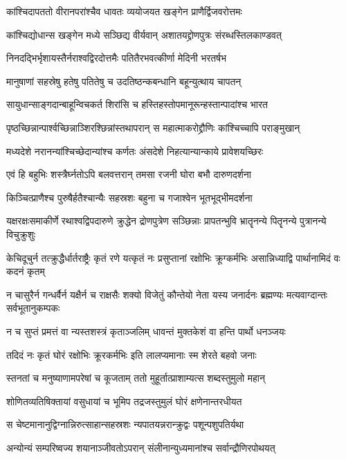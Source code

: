 \twolineshloka
{कांश्चिदापततो वीरानपरांश्चैव धावतः}
{व्ययोजयत खङ्गेन प्राणैर्द्विजवरोत्तमः}


\twolineshloka
{कांश्चिद्योधान्स खङ्गेन मध्ये सञ्छिद्य वीर्यवान्}
{अशातयद्द्रोणपुत्रः संरब्धस्तिलकाण्डवत्}


\twolineshloka
{निनदद्भिर्भृशायस्तैर्नराश्वद्विरदोत्तमैः}
{पतितैरभवत्कीर्णा मेदिनी भरतर्षभ}


\twolineshloka
{मानुषाणां सहस्रेषु हतेषु पतितेषु च}
{उदतिष्ठन्कबन्धानि बहून्युत्थाय चापतन्}


\twolineshloka
{सायुधान्साङ्गदान्बाहून्विचकर्त शिरांसि च}
{हस्तिहस्तोपमानूरून्हस्तान्पादांश्च भारत}


\twolineshloka
{पृष्ठच्छिन्नान्पार्श्वच्छिन्नाञ्शिरश्छिन्नांस्तथापरान्}
{स महात्माकरोद्द्रौणिः कांश्चिच्चापि पराङ्मुखान्}


\twolineshloka
{मध्यदेशे नरानन्यांश्चिच्छेदान्यांश्च कर्णतः}
{अंसदेशे निहत्यान्यान्काये प्रावेशयच्छिरः}


\twolineshloka
{एवं हि बहुभिः शस्त्रैर्घ्नतोऽपि बलवत्तरान्}
{तमसा रजनी घोरा बभौ दारुणदर्शना}


\twolineshloka
{किञ्चित्प्राणैश्च पुरुषैर्हतैश्चान्यैः सहस्रशः}
{बहुना च गजाश्वेन भूतभूद्भीमदर्शना}


\threelineshloka
{यक्षरक्षःसमाकीर्णे रथाश्वद्विपदारुणे}
{क्रुद्धेन द्रोणपुत्रेण सञ्छिन्नाः प्रापतन्भुवि}
{भ्रातॄनन्ये पितॄनन्ये पुत्रानन्ये विचुक्रुशुः}


\threelineshloka
{केचिदूचुर्न तत्क्रुद्धैर्धार्तराष्ट्रैः कृतं रणे}
{यत्कृतं नः प्रसुप्तानां रक्षोभिः क्रूग्कर्मभिः}
{असान्निध्याद्वि पार्थानामिदं वः कदनं कृतम्}


\threelineshloka
{न चासुरैर्न गन्धर्वैर्न यक्षैर्न च राक्षसैः}
{शक्यो विजेतुं कौन्तेयो नेता यस्य जनार्दनः}
{ब्रह्मण्यः मत्यवाग्दान्तः सर्वभूतानुकम्पकः}


\twolineshloka
{न च सुप्तं प्रमत्तं वा न्यस्तशस्त्रं कृताञ्जलिम्}
{धावन्तं मुक्तकेशं वा हन्ति पार्थो धनञ्जयः}


\twolineshloka
{तदिदं नः कृतं घोरं रक्षोभिः क्रूरकर्मभिः}
{इति लालप्यमानाः स्म शेरते बहवो जनाः}


\twolineshloka
{स्तनतां च मनुष्याणामपरेषां च कूजताम्}
{ततो मुहूर्तात्प्राशाम्यत्स शब्दस्तुमुलो महान्}


\twolineshloka
{शोणितव्यतिषिक्तायां वसुधायां च भूमिप}
{तद्रजस्तुमुलं घोरं क्षणेनान्तरधीयत}


\twolineshloka
{स चेष्टमानानुद्विग्नान्निरुत्साहान्सहस्रशः}
{न्यपातयन्नरान्क्रुद्वः पशून्पशुपतिर्यथा}


\twolineshloka
{अन्योन्यं सम्परिष्वज्य शयानाञ्जीवतोऽपरान्}
{संलीनान्युध्यमानांश्च सर्वान्द्रौणिरपोथयत्}


